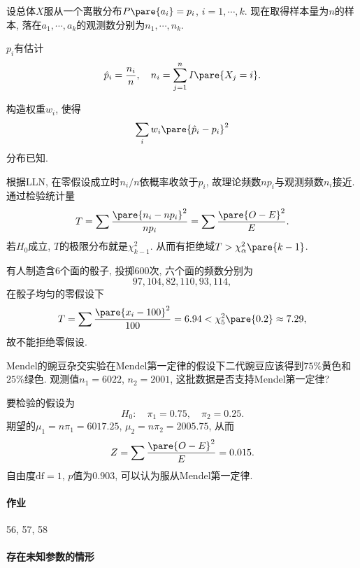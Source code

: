 \documentclass[../Statistics.tex]{subfiles}
\begin{document}
设总体$X$服从一个离散分布$P\pare{a_i} = p_i$, $i = 1,\cdots,k$. 现在取得样本量为$n$的样本, 落在$a_1,\cdots,a_k$的观测数分别为$n_1,\cdots,n_k$.
\begin{cenum}
    \item $p_i$有估计
    \[ \hat p_i = \frac{n_i}{n},\quad n_i = \sum_{j=1}^n I\pare{X_j = i}. \]
    \item 构造权重$w_i$, 使得
    \[ \sum_{i} w_i\pare{\hat p_i - p_i}^2 \]
    分布已知.
\end{cenum}
根据LLN, 在零假设成立时$n_i/n$依概率收敛于$p_i$, 故理论频数$np_i$与观测频数$n_i$接近. 通过检验统计量
\[ T = \sum \frac{\pare{n_i - np_i}^2}{np_i} = \sum \frac{\pare{O-E}^2}{E}. \]
若$H_0$成立, $T$的极限分布就是$\chi^2_{k-1}$. 从而有拒绝域$T>\chi_\alpha^2\pare{k-1}$.
\begin{sample}
    \begin{ex}
        有人制造含$6$个面的骰子, 投掷$600$次, 六个面的频数分别为
        \[ 97, 104, 82, 110, 93, 114, \]
        在骰子均匀的零假设下
        \[ T = \sum \frac{\pare{x_i - 100}^2}{100} = 6.94 < \chi_5^2\pare{0.2}\approx 7.29, \]
        故不能拒绝零假设.
    \end{ex}
\end{sample}
\begin{sample}
    \begin{ex}
        Mendel的豌豆杂交实验在Mendel第一定律的假设下二代豌豆应该得到$75\%$黄色和$25\%$绿色. 观测值$n_1 = 6022$, $n_2 = 2001$, 这批数据是否支持Mendel第一定律?
    \end{ex}
    \begin{solution}
        要检验的假设为
        \[ H_0:\quad \pi_1 = 0.75,\quad \pi_2 = 0.25. \]
        期望的$\mu_1 = n\pi_1 = 6017.25$, $\mu_2 = n\pi_2 = 2005.75$, 从而
        \[ Z = \sum \frac{\pare{O-E}^2}{E} = 0.015. \]
        自由度$\mathrm{df} = 1$, $p$值为$0.903$, 可以认为服从Mendel第一定律.
    \end{solution}
\end{sample}

\paragraph{作业} %
\label{par:作业}

56, 57, 58


\paragraph{存在未知参数的情形} %
\label{par:存在未知参数的情形}
\end{document}
